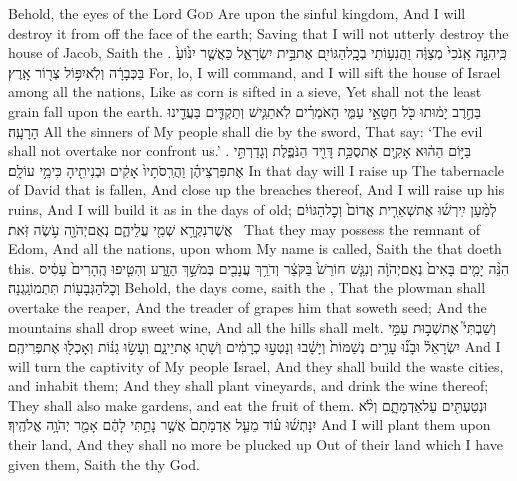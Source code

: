 {Behold, the eyes of the Lord \textsc{God} Are upon the sinful kingdom, And I will destroy it from off the face of the earth; Saving that I will not utterly destroy the house of Jacob, Saith the \lord.}
{כִּֽי\maqqaf הִנֵּ֤ה אָֽנֹכִי֙ מְצַוֶּ֔ה וַהֲנִע֥וֹתִי בְכׇֽל\maqqaf הַגּוֹיִ֖ם אֶת\maqqaf בֵּ֣ית יִשְׂרָאֵ֑ל כַּאֲשֶׁ֤ר יִנּ֙וֹעַ֙ בַּכְּבָרָ֔ה וְלֹֽא\maqqaf יִפּ֥וֹל צְר֖וֹר אָֽרֶץ׃}
{For, lo, I will command, and I will sift the house of Israel among all the nations, Like as corn is sifted in a sieve, Yet shall not the least grain fall upon the earth.}
{בַּחֶ֣רֶב יָמ֔וּתוּ כֹּ֖ל חַטָּאֵ֣י עַמִּ֑י הָאֹמְרִ֗ים לֹֽא\maqqaf תַגִּ֧ישׁ וְתַקְדִּ֛ים בַּעֲדֵ֖ינוּ הָרָעָֽה׃}
{All the sinners of My people shall die by the sword, That say: ‘The evil shall not overtake nor confront us.’ .}
{בַּיּ֣וֹם הַה֔וּא אָקִ֛ים אֶת\maqqaf סֻכַּ֥ת דָּוִ֖יד הַנֹּפֶ֑לֶת וְגָדַרְתִּ֣י אֶת\maqqaf פִּרְצֵיהֶ֗ן וַהֲרִֽסֹתָיו֙ אָקִ֔ים וּבְנִיתִ֖יהָ כִּימֵ֥י עוֹלָֽם׃}
{In that day will I raise up The tabernacle of David that is fallen, And close up the breaches thereof, And I will raise up his ruins, And I will build it as in the days of old;}
{לְמַ֨עַן יִֽירְשׁ֜וּ אֶת\maqqaf שְׁאֵרִ֤ית אֱדוֹם֙ וְכׇל\maqqaf הַגּוֹיִ֔ם אֲשֶׁר\maqqaf נִקְרָ֥א שְׁמִ֖י עֲלֵיהֶ֑ם נְאֻם\maqqaf יְהֹוָ֖ה עֹ֥שֶׂה זֹּֽאת׃ \petucha }
{That they may possess the remnant of Edom, And all the nations, upon whom My name is called, Saith the \lord\space that doeth this.}
{הִנֵּ֨ה יָמִ֤ים בָּאִים֙ נְאֻם\maqqaf יְהֹוָ֔ה וְנִגַּ֤שׁ חוֹרֵשׁ֙ בַּקֹּצֵ֔ר וְדֹרֵ֥ךְ עֲנָבִ֖ים בְּמֹשֵׁ֣ךְ הַזָּ֑רַע וְהִטִּ֤יפוּ הֶֽהָרִים֙ עָסִ֔יס וְכׇל\maqqaf הַגְּבָע֖וֹת תִּתְמוֹגַֽגְנָה׃}
{Behold, the days come, saith the \lord, That the plowman shall overtake the reaper, And the treader of grapes him that soweth seed; And the mountains shall drop sweet wine, And all the hills shall melt.}
{וְשַׁבְתִּי֮ אֶת\maqqaf שְׁב֣וּת עַמִּ֣י יִשְׂרָאֵל֒ וּבָנ֞וּ עָרִ֤ים נְשַׁמּוֹת֙ וְיָשָׁ֔בוּ וְנָטְע֣וּ כְרָמִ֔ים וְשָׁת֖וּ אֶת\maqqaf יֵינָ֑ם וְעָשׂ֣וּ גַנּ֔וֹת וְאָכְל֖וּ אֶת\maqqaf פְּרִיהֶֽם׃}
{And I will turn the captivity of My people Israel, And they shall build the waste cities, and inhabit them; And they shall plant vineyards, and drink the wine thereof; They shall also make gardens, and eat the fruit of them.}
{וּנְטַעְתִּ֖ים עַל\maqqaf אַדְמָתָ֑ם וְלֹ֨א יִנָּתְשׁ֜וּ ע֗וֹד מֵעַ֤ל אַדְמָתָם֙ אֲשֶׁ֣ר נָתַ֣תִּי לָהֶ֔ם אָמַ֖ר יְהֹוָ֥ה אֱלֹהֶֽיךָ׃}
{And I will plant them upon their land, And they shall no more be plucked up Out of their land which I have given them, Saith the \lord\space thy God.}
